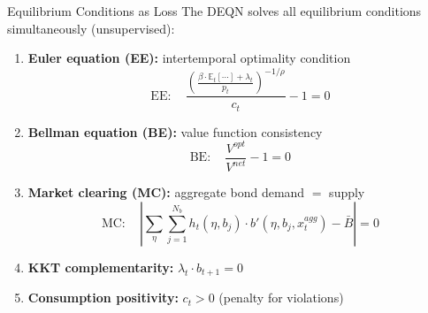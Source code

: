\documentclass[aspectratio=169,11pt]{beamer}
\newcommand{\emphc}[1]{\textcolor{harvardcrimson}{#1}}
\begin{document}
\begin{frame}{Equilibrium Conditions as Loss}
\small
The DEQN solves \emphc{all equilibrium conditions simultaneously} (unsupervised):

\vspace{0.2em}
\begin{enumerate}\itemsep0pt
    \item \textbf{Euler equation (EE):} intertemporal optimality condition
    \vspace{-0.3em}
    \[
    \text{EE}: \quad \frac{\left(\frac{\beta \cdot \mathbb{E}_t[\cdots] + \lambda_t}{p_t}\right)^{-1/\rho}}{c_t} - 1 = 0
    \]
    \vspace{-0.5em}

    \item \textbf{Bellman equation (BE):} value function consistency
    \vspace{-0.3em}
    \[
    \text{BE}: \quad \frac{V^{opt}}{V^{net}} - 1 = 0
    \]
    \vspace{-0.5em}

    \item \textbf{Market clearing (MC):} aggregate bond demand $=$ supply
    \vspace{-0.3em}
    \[
    \text{MC}: \quad \left|\sum_{\eta} \sum_{j=1}^{N_b} h_t(\eta, b_j) \cdot b'(\eta, b_j, x_t^{agg}) - \bar B\right| = 0
    \]
    \vspace{-0.5em}

    \item \textbf{KKT complementarity:} $\lambda_t \cdot b_{t+1} = 0$

    \item \textbf{Consumption positivity:} $c_t > 0$ (penalty for violations)
\end{enumerate}
\end{frame}
\end{document}
